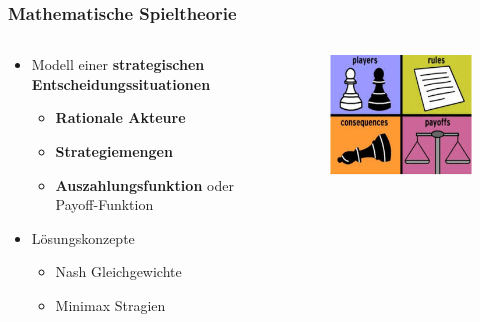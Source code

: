 \documentclass{beamer}
\begin{document}
		\begin{frame}
			\frametitle{Mathematische Spieltheorie}
            
			\begin{columns}
				\begin{column}{0.58\textwidth}
					\begin{itemize}
                        \item Modell einer \textbf{strategischen
                            Entscheidungssituationen} 
                            \begin{itemize}
                                \item \textbf{Rationale Akteure}
                                \item \textbf{Strategiemengen}
                                \item \textbf{Auszahlungsfunktion} oder Payoff-Funktion
                            \end{itemize}
                        \item Lösungskonzepte
                            \begin{itemize}
                                \item Nash Gleichgewichte
                                \item Minimax Stragien
                            \end{itemize}
					\end{itemize}
				\end{column}
				\begin{column}{0.48\textwidth}
					\begin{figure}
						\includegraphics[scale = 0.45]{images/gameTheory.jpeg}
					\end{figure}
				\end{column}
			\end{columns}
		\end{frame}
		
\end{document}
